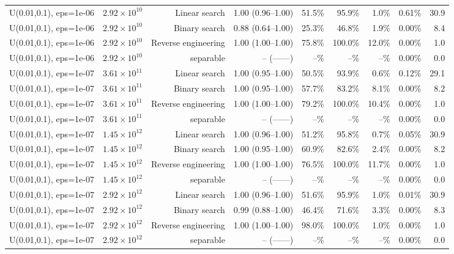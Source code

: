 \begin{tabular}{llrrrrrrr}
U(0.01,0.1), eps=1e-06 & $2.92\times 10^{10}$ & Linear search & 1.00 (0.96--1.00) & 51.5\% & 95.9\% & 1.0\% & 0.61\% & 30.9 \\
U(0.01,0.1), eps=1e-06 & $2.92\times 10^{10}$ & Binary search & 0.88 (0.64--1.00) & 25.3\% & 46.8\% & 1.9\% & 0.00\% & 8.4 \\
U(0.01,0.1), eps=1e-06 & $2.92\times 10^{10}$ & Reverse engineering & 1.00 (1.00--1.00) & 75.8\% & 100.0\% & 12.0\% & 0.00\% & 1.0 \\
U(0.01,0.1), eps=1e-06 & $2.92\times 10^{10}$ & separable & -- (------) & --\% & --\% & --\% & 0.00\% & 0.0 \\
U(0.01,0.1), eps=1e-07 & $3.61\times 10^{11}$ & Linear search & 1.00 (0.95--1.00) & 50.5\% & 93.9\% & 0.6\% & 0.12\% & 29.1 \\
U(0.01,0.1), eps=1e-07 & $3.61\times 10^{11}$ & Binary search & 1.00 (0.95--1.00) & 57.7\% & 83.2\% & 8.1\% & 0.00\% & 8.2 \\
U(0.01,0.1), eps=1e-07 & $3.61\times 10^{11}$ & Reverse engineering & 1.00 (1.00--1.00) & 79.2\% & 100.0\% & 10.4\% & 0.00\% & 1.0 \\
U(0.01,0.1), eps=1e-07 & $3.61\times 10^{11}$ & separable & -- (------) & --\% & --\% & --\% & 0.00\% & 0.0 \\
U(0.01,0.1), eps=1e-07 & $1.45\times 10^{12}$ & Linear search & 1.00 (0.96--1.00) & 51.2\% & 95.8\% & 0.7\% & 0.05\% & 30.9 \\
U(0.01,0.1), eps=1e-07 & $1.45\times 10^{12}$ & Binary search & 1.00 (0.95--1.00) & 60.9\% & 82.6\% & 2.4\% & 0.00\% & 8.2 \\
U(0.01,0.1), eps=1e-07 & $1.45\times 10^{12}$ & Reverse engineering & 1.00 (1.00--1.00) & 76.5\% & 100.0\% & 11.7\% & 0.00\% & 1.0 \\
U(0.01,0.1), eps=1e-07 & $1.45\times 10^{12}$ & separable & -- (------) & --\% & --\% & --\% & 0.00\% & 0.0 \\
U(0.01,0.1), eps=1e-07 & $2.92\times 10^{12}$ & Linear search & 1.00 (0.96--1.00) & 51.6\% & 95.9\% & 1.0\% & 0.01\% & 30.9 \\
U(0.01,0.1), eps=1e-07 & $2.92\times 10^{12}$ & Binary search & 0.99 (0.88--1.00) & 46.4\% & 71.6\% & 3.3\% & 0.00\% & 8.3 \\
U(0.01,0.1), eps=1e-07 & $2.92\times 10^{12}$ & Reverse engineering & 1.00 (1.00--1.00) & 98.0\% & 100.0\% & 1.0\% & 0.00\% & 1.0 \\
U(0.01,0.1), eps=1e-07 & $2.92\times 10^{12}$ & separable & -- (------) & --\% & --\% & --\% & 0.00\% & 0.0 \\

\end{tabular}
